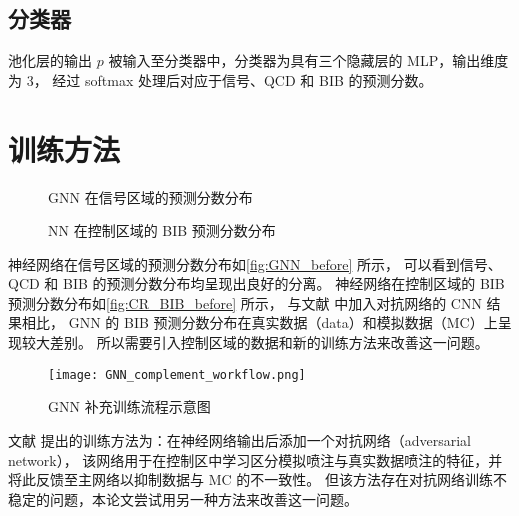 \subsection{分类器}
池化层的输出 $p$ 被输入至分类器中，分类器为具有三个隐藏层的 MLP，输出维度为 3，
经过 softmax 处理后对应于信号、QCD 和 BIB 的预测分数。


\section{训练方法}
\begin{figure}[ht]
    \centering
    \hfill
    \hfill
    \caption{GNN 在信号区域的预测分数分布}
    \label{fig:GNN_before}
\end{figure}

\begin{figure}[ht]
    \centering
    \hfill
    \caption{NN 在控制区域的 BIB 预测分数分布}
    \label{fig:CR_BIB_before}
\end{figure}

神经网络在信号区域的预测分数分布如\autoref{fig:GNN_before} 所示，
可以看到信号、QCD 和 BIB 的预测分数分布均呈现出良好的分离。
神经网络在控制区域的 BIB 预测分数分布如\autoref{fig:CR_BIB_before} 所示，
与文献\cite{ATLAS:2022zhj} 中加入对抗网络的 CNN 结果相比，
GNN 的 BIB 预测分数分布在真实数据（data）和模拟数据（MC）上呈现较大差别。
所以需要引入控制区域的数据和新的训练方法来改善这一问题。

\begin{figure}[ht]
    \texttt{[image: GNN\_complement\_workflow.png]}
    \caption{GNN 补充训练流程示意图}
    \label{fig:GNN_complement_workflow}
\end{figure}

文献\cite{ATLAS:2022zhj} 提出的训练方法为：在神经网络输出后添加一个对抗网络（adversarial network），
该网络用于在控制区中学习区分模拟喷注与真实数据喷注的特征，并将此反馈至主网络以抑制数据与 MC 的不一致性。
但该方法存在对抗网络训练不稳定的问题，本论文尝试用另一种方法来改善这一问题。

